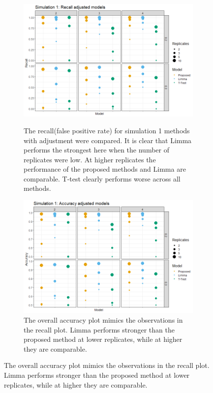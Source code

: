 \documentclass{mcp}
\begin{document}
\begin{figure}[h!]
\centering
 \begin{subfigure}{.9\textwidth}
	\includegraphics[width=.9\textwidth]{sim_new/sim1_Recall}\\
	\caption{The recall(false positive rate) for simulation 1 methods with adjustment were compared. It is clear that Limma performs the strongest here when the number of replicates were low.  At higher replicates the performance of the proposed methods and Limma are comparable. T-test clearly performs worse across all methods.}
 \end{subfigure}
 \begin{subfigure}{.9\textwidth}
	\includegraphics[width=.9\textwidth]{sim_new/sim1_accuracy}
	\caption{The overall accuracy plot mimics the observations in the recall plot. Limma performs stronger than the proposed method at lower replicates, while at higher they are comparable.}
 \end{subfigure}
\label{fig:sim1_recall}
\end{figure}
\end{document}
